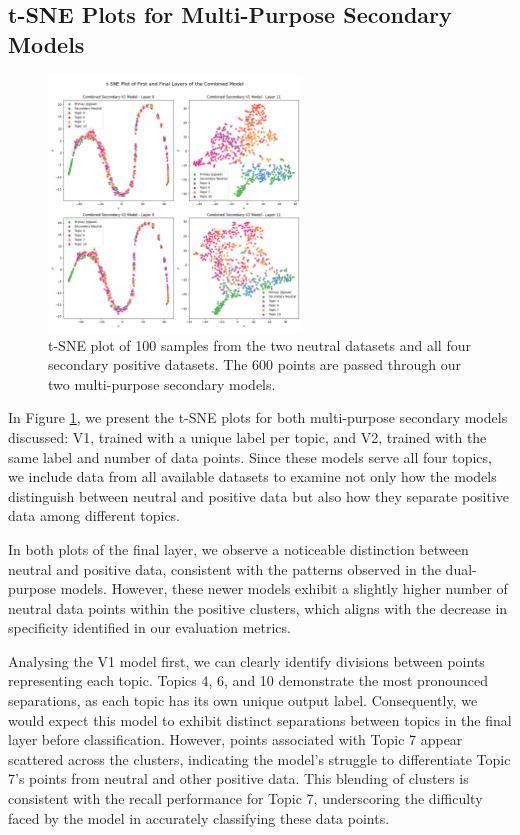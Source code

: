 \subsection{t-SNE Plots for Multi-Purpose Secondary Models}

\begin{figure}[ht]
    \centering
    \includegraphics[width=0.6\textwidth]{graphs/tsne/combined.png}
    \caption{t-SNE plot of 100 samples from the two neutral datasets and all four secondary positive datasets. The 600 points are passed through our two multi-purpose secondary models.}
    \label{fig:t_sne_plot_comb}
\end{figure}

In Figure \ref{fig:t_sne_plot_comb}, we present the t-SNE plots for both multi-purpose secondary models discussed: V1, trained with a unique label per topic, and V2, trained with the same label and number of data points. Since these models serve all four topics, we include data from all available datasets to examine not only how the models distinguish between neutral and positive data but also how they separate positive data among different topics.

In both plots of the final layer, we observe a noticeable distinction between neutral and positive data, consistent with the patterns observed in the dual-purpose models. However, these newer models exhibit a slightly higher number of neutral data points within the positive clusters, which aligns with the decrease in specificity identified in our evaluation metrics.

Analysing the V1 model first, we can clearly identify divisions between points representing each topic. Topics 4, 6, and 10 demonstrate the most pronounced separations, as each topic has its own unique output label. Consequently, we would expect this model to exhibit distinct separations between topics in the final layer before classification. However, points associated with Topic 7 appear scattered across the clusters, indicating the model's struggle to differentiate Topic 7's points from neutral and other positive data. This blending of clusters is consistent with the recall performance for Topic 7, underscoring the difficulty faced by the model in accurately classifying these data points.


